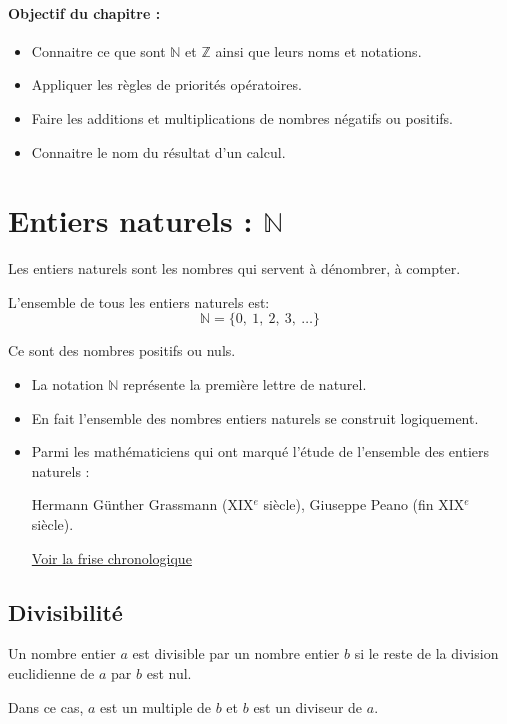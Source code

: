 \paragraph*{Objectif du chapitre :}
\begin{itemize}
\item  Connaitre ce que sont $\mathbb{N}$ et $\mathbb{Z}$ ainsi que leurs noms et notations.
\item  Appliquer les règles de priorités opératoires.
\item  Faire les additions et multiplications de nombres négatifs ou positifs.
\item  Connaitre le nom du résultat d'un calcul.
\end{itemize}

\section{Entiers naturels : $\mathbb{N}$}

\begin{defi}{}{}
\noindent Les entiers naturels sont les nombres qui servent à dénombrer, à compter.

\noindent L'ensemble de tous les entiers naturels est: $$\mathbb{N}=\{ 0,\ 1,\ 2,\ 3,\ \dots \}$$

\noindent Ce sont des nombres positifs ou nuls.
\end{defi}

\begin{rem}{}{}
\begin{itemize}
\item La notation $\mathbb{N}$ représente la première lettre de \og naturel\fg{}.
\item En fait l'ensemble des nombres entiers naturels se construit logiquement.
\item Parmi les mathématiciens qui ont marqué l'étude de l'ensemble des entiers naturels : 

Hermann Günther Grassmann (XIX$^e$ siècle), Giuseppe Peano (fin XIX$^e$ siècle).

\medskip
\href{https://www.axelnax.fr/index.php?p=frise}{Voir la frise chronologique}
\end{itemize}
\end{rem}

\subsection{Divisibilité}

\begin{defi}{}{}
Un nombre entier $a$ est divisible par un nombre entier $b$ si le reste de la division euclidienne de $a$ par $b$ est nul. 

\noindent Dans ce cas, $a$ est un multiple de $b$ et $b$ est un diviseur de $a$.
\end{defi}

